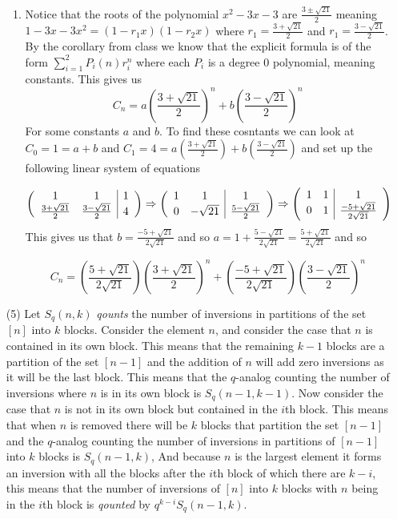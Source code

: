 \documentclass[12pt]{amsart}
\theoremstyle{definition}
\begin{document}
\begin{itemize}
\begin{enumerate}[label=(\alph*)]
    \item Notice that the roots of the polynomial $x^2-3x-3$ are $\frac{3\pm \sqrt{21}}{2}$ meaning $1-3x-3x^2=(1-r_1x)(1-r_2x)$ where $r_1=\frac{3+ \sqrt{21}}{2}$ and $r_1=\frac{3- \sqrt{21}}{2}$. By the corollary from class we know that the explicit formula is of the form $\sum_{i=1}^2 P_{i}(n)r_i^n$ where each $P_i$ is a degree $0$ polynomial, meaning constants.
    This gives us 
    $$C_n=a\left(\frac{3+ \sqrt{21}}{2}\right)^n+b\left(\frac{3- \sqrt{21}}{2}\right)^n$$
    For some constants $a$ and $b$. To find these cosntants we can look at $C_0=1=a+b$ and $C_1=4=a\left(\frac{3+ \sqrt{21}}{2}\right)+b\left(\frac{3- \sqrt{21}}{2}\right)$ and set up the following linear system of equations

    $$\left(\begin{array}{c c|c} 
	1 & 1 & 1\\
        \frac{3+ \sqrt{21}}{2} & \frac{3- \sqrt{21}}{2} & 4
\end{array}\right)\Rightarrow \left(\begin{array}{c c|c} 
	1 & 1 & 1\\
        0 & -\sqrt{21} & \frac{5- \sqrt{21}}{2}
\end{array}\right)\Rightarrow \left(\begin{array}{c c|c} 
	1 & 1 & 1\\
        0 & 1 & \frac{-5+\sqrt{21}}{2\sqrt{21}}
\end{array}\right) $$
This gives us that $b=\frac{-5+\sqrt{21}}{2\sqrt{21}}$ and so $a=1+\frac{5-\sqrt{21}}{2\sqrt{21}}=\frac{5+\sqrt{21}}{2\sqrt{21}}$ and so 

$$C_n=\left(\frac{5+\sqrt{21}}{2\sqrt{21}}\right)\left(\frac{3+ \sqrt{21}}{2}\right)^n+\left(\frac{-5+\sqrt{21}}{2\sqrt{21}}\right)\left(\frac{3- \sqrt{21}}{2}\right)^n$$

\end{enumerate}

\item[(5)]
Let $S_q(n,k)$ \textit{qounts} the number of inversions in partitions of the set $\left[n\right]$ into $k$ blocks. Consider the element $n$, and consider the case that $n$ is contained in its own block. This means that the remaining $k-1$ blocks are a partition of the set $[n-1]$ and the addition of $n$ will add zero inversions as it will be the last block. This means that the $q$-analog counting the number of inversions where $n$ is in its own block is $S_q(n-1,k-1)$. Now consider the case that $n$ is not in its own block but contained in the $i$th block. This means that when $n$ is removed there will be $k$ blocks that partition the set $[n-1]$ and the $q$-analog counting the number of inversions in partitions of $[n-1]$ into $k$ blocks is $S_q(n-1,k)$, And because $n$ is the largest element it forms an inversion with all the blocks after the $i$th block of which there are $k-i$, this means that the number of inversions of $[n]$ into $k$ blocks with $n$ being in the $i$th block is \textit{qounted} by $q^{k-i}S_q(n-1,k)$.\\


\end{itemize}
\end{document}
